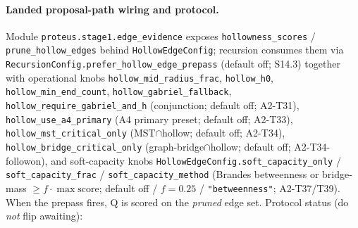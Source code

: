 \documentclass[11pt]{article}
\begin{document}
\paragraph{Landed proposal-path wiring and protocol.}
Module \texttt{proteus.stage1.edge\_evidence} exposes
\texttt{hollowness\_scores} / \texttt{prune\_hollow\_edges} behind
\texttt{HollowEdgeConfig}; recursion consumes them via
\texttt{RecursionConfig.prefer\_hollow\_edge\_prepass} (default off; S14.3)
together with operational knobs
\texttt{hollow\_mid\_radius\_frac}, \texttt{hollow\_h0},
\texttt{hollow\_min\_end\_count}, \texttt{hollow\_gabriel\_fallback},
\texttt{hollow\_require\_gabriel\_and\_h} (conjunction; default off; A2-T31),
\texttt{hollow\_use\_a4\_primary} (A4 primary preset; default off; A2-T33),
\texttt{hollow\_mst\_critical\_only} (MST$\cap$hollow; default off; A2-T34),
\texttt{hollow\_bridge\_critical\_only} (graph-bridge$\cap$hollow; default
off; A2-T34-followon), and soft-capacity knobs
\texttt{HollowEdgeConfig.soft\_capacity\_only} /
\texttt{soft\_capacity\_frac} /
\texttt{soft\_capacity\_method} (Brandes betweenness or bridge-mass
$\ge f\cdot\max\mathrm{score}$; default off / $f{=}0.25$ /
\texttt{"betweenness"}; A2-T37/T39). When the prepass
fires, Q is scored on the \emph{pruned} edge set. Protocol status (do
\emph{not} flip awaiting):
\end{document}
